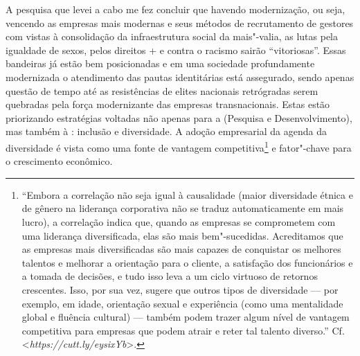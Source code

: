A pesquisa que levei a cabo me fez concluir que havendo modernização, ou
seja, vencendo as empresas mais modernas e seus métodos de recrutamento
de gestores com vistas à consolidação da infraestrutura social da
mais"-valia, as lutas pela igualdade de sexos, pelos direitos + e
contra o racismo sairão ``vitoriosas''. Essas bandeiras já estão bem
posicionadas e em uma sociedade profundamente modernizada o atendimento
das pautas identitárias está assegurado, sendo apenas questão de tempo
até as resistências de elites nacionais retrógradas serem quebradas pela
força modernizante das empresas transnacionais. Estas estão priorizando
estratégias voltadas não apenas para a  (Pesquisa e
Desenvolvimento), mas também à : inclusão e diversidade. A adoção
empresarial da agenda da diversidade é vista como uma fonte de vantagem
competitiva\footnote{``Embora a correlação não seja igual à causalidade
  (maior diversidade étnica e de gênero na liderança corporativa não se
  traduz automaticamente em mais lucro), a correlação indica que, quando
  as empresas se comprometem com uma liderança diversificada, elas são
  mais bem"-sucedidas. Acreditamos que as empresas mais diversificadas
  são mais capazes de conquistar os melhores talentos e melhorar a
  orientação para o cliente, a satisfação dos funcionários e a tomada de
  decisões, e tudo isso leva a um ciclo virtuoso de retornos crescentes.
  Isso, por sua vez, sugere que outros tipos de diversidade --- por
  exemplo, em idade, orientação sexual e experiência (como uma
  mentalidade global e fluência cultural) --- também podem trazer algum
  nível de vantagem competitiva para empresas que podem atrair e reter
  tal talento diverso.'' Cf.
  \textless{}\emph{https://cutt.ly/eysixYb}\textgreater{}.}
e fator"-chave para o crescimento econômico.

